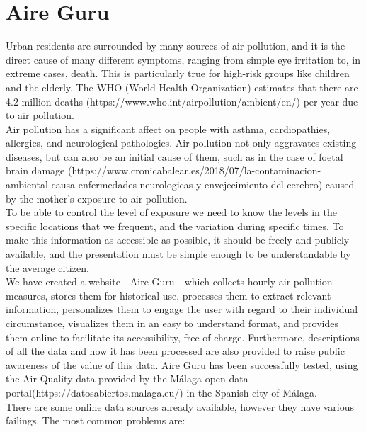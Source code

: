 \section{Aire Guru}

Urban residents are surrounded by many sources of air pollution, and it is the direct cause of many different symptoms, ranging from simple eye irritation to, in extreme cases, death.
This is particularly true for high-risk groups like children and the elderly.
The WHO (World Health Organization) estimates that there are 4.2 million deaths (https://www.who.int/airpollution/ambient/en/) per year due to air pollution.\\

Air pollution has a significant affect on people with asthma, cardiopathies, allergies, and neurological pathologies.
Air pollution not only aggravates existing diseases, but can also be an initial cause of them, such as in the case of foetal brain damage
(https://www.cronicabalear.es/2018/07/la-contaminacion-ambiental-causa-enfermedades-neurologicas-y-envejecimiento-del-cerebro)
caused by the mother's exposure to air pollution.\\

To be able to control the level of exposure we need to know the levels in the specific locations that we frequent, and the variation during specific times.
To make this information as accessible as possible, it should be freely and publicly available, and the presentation must be simple enough to be understandable by the average citizen.\\

We have created a website - Aire Guru - which collects hourly air pollution measures, stores them for historical use, 
processes them to extract relevant information, personalizes them to engage the user with regard to their individual
circumstance, visualizes them in an easy to understand format, and provides them online to facilitate its accessibility, free of charge.
Furthermore, descriptions of all the data and how it has been processed are also provided to raise public awareness of the value of this data.
Aire Guru has been successfully tested, using the Air Quality data provided by the Málaga open data portal(https://datosabiertos.malaga.eu/) in the Spanish city of Málaga.\\

There are some online data sources already available, however they have various failings.
The most common problems are:

